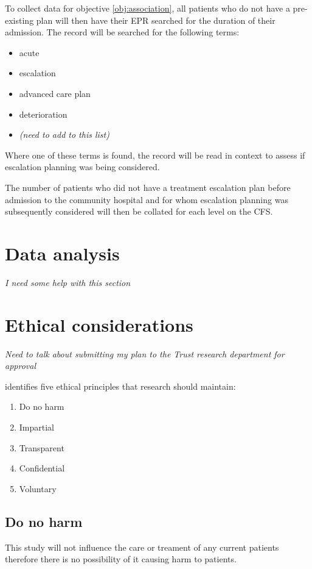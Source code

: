\documentclass
[
	12pt,
	a4paper,
	oneside,
]{article}
\begin{document}
To collect data for objective \ref{obj:association}, all patients who do not have
a pre-existing plan will then have their EPR searched
for the duration of their admission. The record will be searched for the following
terms:

\begin{itemize}
\item acute
\item escalation
\item advanced care plan
\item deterioration
\item \emph{(need to add to this list)}
\end{itemize}

Where one of these terms is found, the record will be read in context to assess if 
escalation planning was being considered.

The number of patients who did not have a treatment escalation plan before admission
to the community hospital and for whom escalation planning was subsequently considered will then be 
collated for each level on the CFS.

\section{Data analysis}
\emph{I need some help with this section}

\section{Ethical considerations}
\emph {Need to talk about submitting my plan to the Trust research department for
	approval }

\textcite{biggam:15} identifies five ethical principles that research should maintain:
\begin{enumerate}
\item Do no harm
\item Impartial
\item Transparent
\item Confidential
\item Voluntary
\end{enumerate}

\subsection{Do no harm}
This study will not influence the care or treament of any current patients therefore
there is no possibility of it causing harm to patients.
\end{document}
